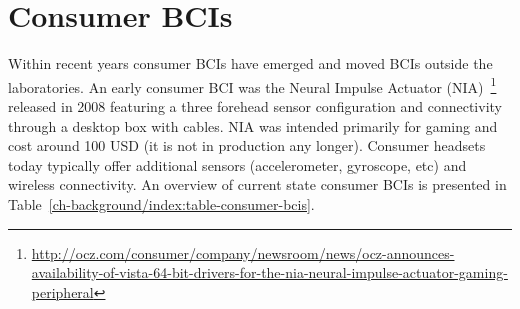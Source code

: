 \documentclass[a4paper,10pt,english,lof,lot,twoside]{puthesis}
\begin{document}
\section{Consumer BCIs}
\label{ch-background/index:consumer-bcis}\label{ch-background/index:ch-background-consumer-bcis}
Within recent years consumer BCIs have emerged and moved BCIs outside the
laboratories. An early consumer BCI was the Neural Impulse Actuator (NIA) \footnote{
\href{http://ocz.com/consumer/company/newsroom/news/ocz-announces-availability-of-vista-64-bit-drivers-for-the-nia-neural-impulse-actuator-gaming-peripheral}{http://ocz.com/consumer/company/newsroom/news/ocz-announces-availability-of-vista-64-bit-drivers-for-the-nia-neural-impulse-actuator-gaming-peripheral}
} released in 2008 featuring a three forehead sensor
configuration and connectivity through a desktop box with cables. NIA was
intended primarily for gaming and cost around 100 USD (it is not in production
any longer). Consumer headsets today typically offer additional sensors
(accelerometer, gyroscope, etc) and wireless connectivity.  An overview of
current state consumer BCIs is presented in Table \ref{ch-background/index:table-consumer-bcis}.
\end{document}
